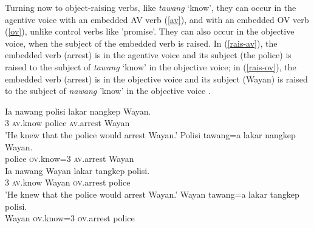 \documentclass[output=paper
	        ,collection
	        ,collectionchapter
 	        ,biblatex
                ,babelshorthands
                ,newtxmath
                ,draftmode
                ,colorlinks, citecolor=brown
]{langscibook}
\begin{document}
Turning now to object-raising verbs, like \emph{tawang} `know',  they can occur in the agentive voice with an embedded AV verb (\ref{av}), and with an embedded OV verb (\ref{ov}), unlike control verbs like 'promise'. 
They can also occur in the objective voice, when the subject of the embedded verb is raised.
In (\ref{rais-av}), the embedded verb (arrest) is in the agentive voice and its subject (the police) is raised to the subject of \emph{tawang} `know' in the objective voice; in (\ref{rais-ov}), the embedded verb (arrest) is in the objective voice and its subject (Wayan) is raised to the subject of \emph{nawang} 'know' in the objective voice \citep[ex 23]{WechslerandArka1998}.

\begin{exe}
\ex \begin{xlist}
\ex 
\gll
Ia nawang polisi lakar nangkep Wayan. \\
3 \textsc{av}.know police \FUT{} \textsc{av}.arrest Wayan \\
\glt 'He knew that the police would arrest Wayan.' \label{av}
\ex
\label{rais-av} 
\gll Polisi tawang=a  lakar nangkep Wayan. \\
     police \textsc{ov}.know=3 \FUT{}   \textsc{av}.arrest Wayan\\

\ex
\gll Ia nawang Wayan lakar tangkep polisi. \\
     3 \textsc{av}.know Wayan \FUT{} \textsc{ov}.arrest police\\
\glt 'He knew that the police would arrest Wayan.' \label{ov}
\ex
\gll Wayan tawang=a lakar tangkep polisi. \\
     Wayan \textsc{ov}.know=3 \FUT{} \textsc{ov}.arrest police\\ \label{rais-ov}
\end{xlist}
\end{exe}
\end{document}
